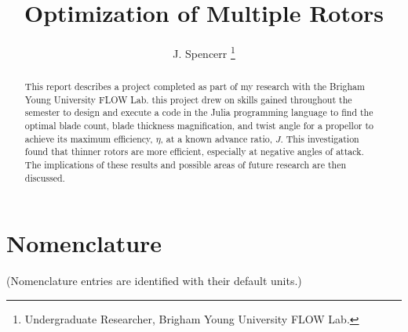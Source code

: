\documentclass[journal ]{new-aiaa}
\title{Optimization of Multiple Rotors}
\author{J. Spencerr \footnote{Undergraduate Researcher, Brigham Young University FLOW Lab.}}
\affil{Brigham Young University, Provo, Utah, 84601} %
\begin{document}
\maketitle

\begin{abstract}
This report describes a project completed as part of my research with the Brigham Young University FLOW Lab. this project drew on skills gained throughout the semester to design and execute a code in the Julia programming language to find the optimal blade count, blade thickness magnification, and twist angle for a propellor to achieve its maximum efficiency, $\eta$, at a known advance ratio, $J$. This investigation found that thinner rotors are more efficient, especially at negative angles of attack. The implications of these results and possible areas of future research are then discussed.

\end{abstract}


\section*{Nomenclature}

\noindent(Nomenclature entries are identified with their default units.)
\end{document}
